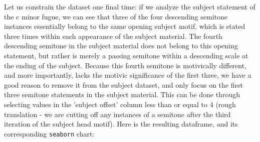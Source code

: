 Let us constrain the dataset one final time: if we analyze the subject
statement of the c minor fugue, we can see that three of the four
descending semitone instances essentially belong to the same opening
subject motif, which is stated three times within each appearance of the
subject material. The fourth descending semitone in the subject material
does not belong to this opening statement, but rather is merely a
passing semitone within a descending scale at the ending of the subject.
Because this fourth semitone is motivically different, and more
importantly, lacks the motivic significance of the first three, we have
a good reason to remove it from the subject dataset, and only focus on
the first three semitone statements in the subject material. This can be
done through selecting values in the 'subject offset' column less than
or equal to 4 (rough translation - we are cutting off any instances of a
semitone after the third iteration of the subject head motif). Here is
the resulting dataframe, and its corresponding \texttt{seaborn} chart:

